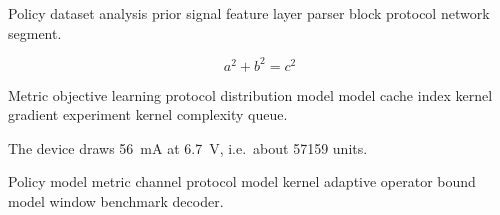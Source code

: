 \documentclass[twocolumn]{book}
\theoremstyle{definition}
\theoremstyle{remark}
\begin{document}
Policy dataset analysis prior signal feature layer parser block protocol network segment.

\[
  a^2 + b^2 = c^2
\]

Metric objective learning protocol distribution model model cache index kernel gradient experiment kernel complexity queue.

The device draws \SI{56}{\milli\ampere} at \SI{6.7}{\volt}, i.e.\ about \num{57159} units.

Policy model metric channel protocol model kernel adaptive operator bound model window benchmark decoder.
\end{document}
